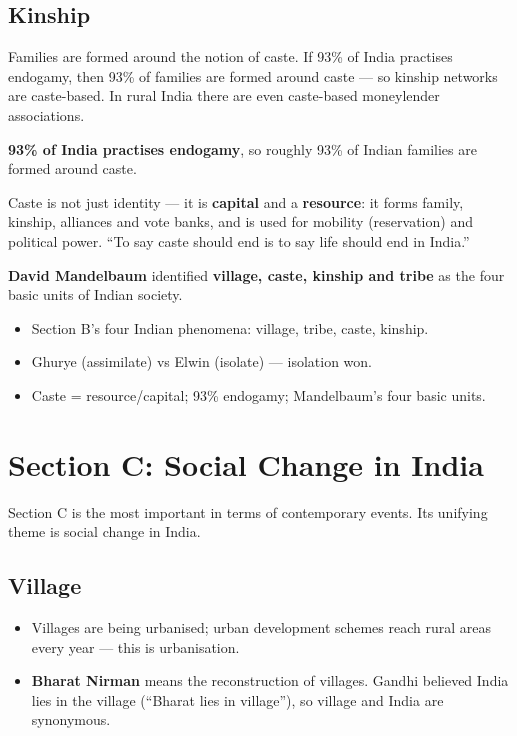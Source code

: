 \subsection{Kinship}

Families are formed around the notion of caste. If 93\% of India practises endogamy, then 93\% of families are formed around caste --- so kinship networks are caste-based. In rural India there are even caste-based moneylender associations.

\begin{DataFact}
\textbf{93\% of India practises endogamy}, so roughly 93\% of Indian families are formed around caste.
\end{DataFact}

\begin{KeyConcept}
Caste is not just identity --- it is \textbf{capital} and a \textbf{resource}: it forms family, kinship, alliances and vote banks, and is used for mobility (reservation) and political power. ``To say caste should end is to say life should end in India.''
\end{KeyConcept}

\textbf{David Mandelbaum} identified \textbf{village, caste, kinship and tribe} as the four basic units of Indian society.

\begin{QuickRevision}
\begin{itemize}
\item Section B's four Indian phenomena: village, tribe, caste, kinship.
\item Ghurye (assimilate) vs Elwin (isolate) --- isolation won.
\item Caste = resource/capital; 93\% endogamy; Mandelbaum's four basic units.
\end{itemize}
\end{QuickRevision}

\section{Section C: Social Change in India}

Section C is the most important in terms of contemporary events. Its unifying theme is social change in India.

\subsection{Village}

\begin{itemize}
\item Villages are being urbanised; urban development schemes reach rural areas every year --- this is urbanisation.
\item \textbf{Bharat Nirman} means the reconstruction of villages. Gandhi believed India lies in the village (``Bharat lies in village''), so village and India are synonymous.
\end{itemize}


